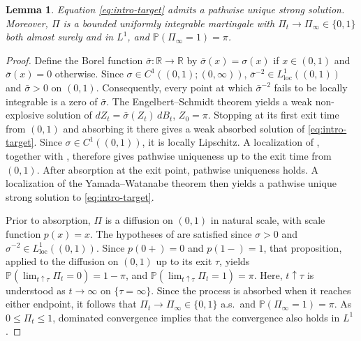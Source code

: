 \documentclass[11pt, reqno]{amsart}
\theoremstyle{plain}
\newtheorem{lemma}[theorem]{Lemma}
\theoremstyle{remark}
\numberwithin{equation}{section}
\begin{document}
\begin{lemma}\label{lem:pi-well-defined}
Equation \eqref{eq:intro-target} admits a pathwise unique strong solution.  Moreover, $\Pi$ is a bounded
uniformly integrable martingale with $\Pi_t\longrightarrow\Pi_\infty\in\{0,1\}$ both almost surely and in $L^1$, and $\mathbb{P}(\Pi_\infty=1)=\pi$.
\end{lemma}

\begin{proof}
Define the Borel function $\bar{\sigma}\colon\mathbb{R}\to\mathbb{R}$ by $\bar{\sigma}(x)=
\sigma(x)$ if $x\in(0,1)$ and $\bar\sigma(x)=0$ otherwise. Since $\sigma\in C^1((0,1);(0,\infty))$, $\bar\sigma^{-2}\in L^1_{\mathrm{loc}}((0,1))$ and $\bar\sigma>0$ on $(0,1)$. Consequently, every point
at which $\bar{\sigma}^{-2}$ fails to be locally integrable is a zero
of $\bar{\sigma}$.
The Engelbert--Schmidt theorem
\cite[Theorem 5.5.4]{karatzas-shreve} yields a weak
non-explosive solution of $dZ_t=\bar{\sigma}(Z_t)\,dB_t$,  $Z_0=\pi$.
Stopping at its first exit time from $(0,1)$ and absorbing it
there gives a weak absorbed solution of \eqref{eq:intro-target}. Since $\sigma\in C^1((0,1))$, it is locally Lipschitz. A localization
of \cite[Theorem 5.2.5]{karatzas-shreve}, together with
\cite[Remark 5.3.3]{karatzas-shreve}, therefore gives pathwise
uniqueness up to the exit time from $(0,1)$. After absorption at the exit point, pathwise uniqueness holds. A localization of the Yamada--Watanabe theorem
\cite[Corollary 5.3.23]{karatzas-shreve} then yields a pathwise unique
strong solution to \eqref{eq:intro-target}.

Prior to absorption, $\Pi$
is a diffusion on $(0,1)$ in natural scale, with scale function $p(x)=x$.
The hypotheses of
\cite[Proposition 5.5.22(d)]{karatzas-shreve} are satisfied since
$\sigma>0$ and $\sigma^{-2}\in L^1_{\mathrm{loc}}((0,1))$. Since $p(0+)=0$ and $p(1-)=1$,
that proposition, applied to the diffusion on $(0,1)$ up to its
exit $\tau$, yields $\mathbb{P}\left(\lim_{t\uparrow\tau}\Pi_t=0\right)
  =
  1-\pi$, and $\mathbb{P}\left(\lim_{t\uparrow\tau}\Pi_t=1\right)
  =
  \pi$.
Here, $t\uparrow\tau$ is understood as $t\to\infty$ on
$\{\tau=\infty\}$. Since the process is absorbed when it reaches either
endpoint, it follows that $\Pi_t\rightarrow\Pi_\infty\in\{0,1\}$ a.s.~and $\mathbb{P}(\Pi_\infty=1)=\pi$.
As $0\leq\Pi_t\leq1$, dominated convergence implies that
the convergence also holds in $L^1$. 
%
%
%
%
%
%
%
%
%
%
\end{proof}

%
\end{document}
